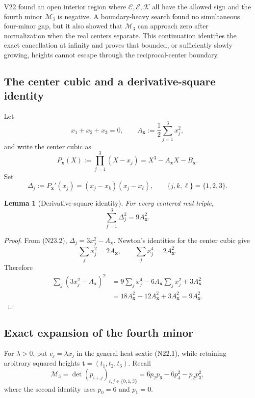 \documentclass[11pt]{article}
\newtheorem{lemma}[theorem]{Lemma}
\theoremstyle{definition}
\theoremstyle{remark}
\begin{document}
V22 found an open interior region where
\(\mathcal C,\mathcal E,\mathcal K\) all have the allowed sign and the
fourth minor \(\mathcal M_3\) is negative.  A boundary-heavy search found
no simultaneous four-minor gap, but it also showed that
\(\mathcal M_3\) can approach zero after normalization when the real
centers separate.  This continuation identifies the exact cancellation
at infinity and proves that bounded, or sufficiently slowly growing,
heights cannot escape through the reciprocal-center boundary.

\subsection{The center cubic and a derivative-square identity}
\label{subsec:f2v23-center-cubic}

Let
\[
 x_1+x_2+x_3=0,\qquad
 A_{\bm x}:=\frac12\sum_{j=1}^3x_j^2,
 \tag{N23.1}
\]
and write the center cubic as
\[
 P_{\bm x}(X):=\prod_{j=1}^3(X-x_j)
 =X^3-A_{\bm x}X-B_{\bm x}.
 \tag{N23.2}
\]
Set
\[
 \Delta_j:=P_{\bm x}'(x_j)
 =(x_j-x_k)(x_j-x_\ell),
 \qquad \{j,k,\ell\}=\{1,2,3\}.
 \tag{N23.3}
\]

\begin{lemma}[Derivative-square identity]
\label{lem:f2v23-derivative-square}
For every centered real triple,
\[
 \sum_{j=1}^3\Delta_j^2=9A_{\bm x}^2.
 \tag{N23.4}
\]
\end{lemma}

\begin{proof}
From \textup{(N23.2)},
\(\Delta_j=3x_j^2-A_{\bm x}\).  Newton's identities for the center cubic
give
\[
 \sum_jx_j^2=2A_{\bm x},
 \qquad
 \sum_jx_j^4=2A_{\bm x}^2.
 \tag{N23.5}
\]
Therefore
\[
\begin{aligned}
 \sum_j(3x_j^2-A_{\bm x})^2
 &=9\sum_jx_j^4-6A_{\bm x}\sum_jx_j^2+3A_{\bm x}^2\\
 &=18A_{\bm x}^2-12A_{\bm x}^2+3A_{\bm x}^2
 =9A_{\bm x}^2.
\end{aligned}
\]
\end{proof}

\subsection{Exact expansion of the fourth minor}
\label{subsec:f2v23-expansion}

For \(\lambda>0\), put \(c_j=\lambda x_j\) in the general heat sextic
\textup{(N22.1)}, while retaining arbitrary squared heights
\(\bm t=(t_1,t_2,t_3)\).  Recall
\[
 \mathcal M_3
 =\det(p_{i+j})_{i,j\in\{0,1,3\}}
 =6p_2p_6-6p_4^2-p_2p_3^2,
 \tag{N23.6}
\]
where the second identity uses \(p_0=6\) and \(p_1=0\).
\end{document}
